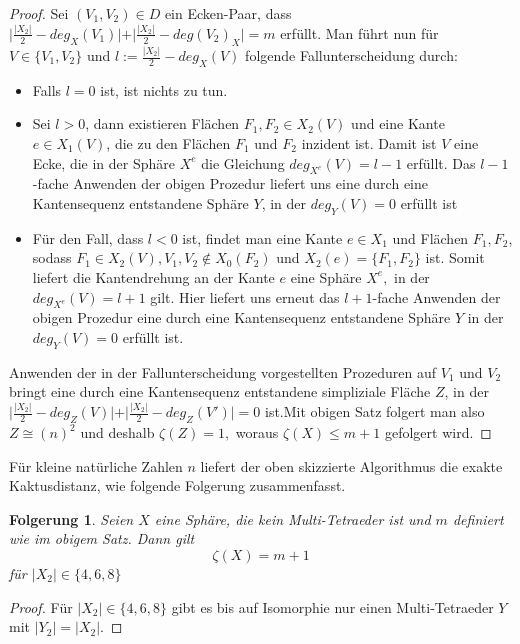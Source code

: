 \documentclass[12pt,titlepage,twoside,cleardoublepage]{article}
\theoremstyle{nummermitklammern}
\newtheorem{folgerung}[temp]{Folgerung}
\newtheorem{folgerung}[zahl]{Folgerung}
\numberwithin{equation}{section}
\begin{document}
\begin{proof}
Sei $(V_1,V_2)\in D$ ein Ecken-Paar, dass 
$\vert\frac{\vert X_2 \vert}{2}-deg_X(V_1)\vert +\vert \frac{\vert X_2 \vert}{2}-deg(V_2)_X\vert=m$ erfüllt.
Man führt nun für $V \in \{V_1,V_2\}$ und $l:=\frac{\vert X_2 \vert}{2}-deg_X(V)$ folgende Fallunterscheidung durch:
\begin{itemize}
\item Falls $l=0$ ist, ist nichts zu tun.
\item Sei $l>0$, dann existieren Flächen $F_1,F_2 \in X_2(V)$ und eine Kante $e\in X_1(V)$, die zu den Flächen $F_1$ und $F_2$ inzident ist. Damit ist $V$ eine Ecke, die in der Sphäre $X^e$ die Gleichung $deg_{X^e}(V)=l-1$ erfüllt. Das $l-1$-fache Anwenden der obigen Prozedur liefert uns eine durch eine Kantensequenz entstandene Sphäre $Y$, in der  $deg_Y(V)=0$ erfüllt ist 
 \item Für den Fall, dass $l<0$ ist, findet man eine Kante $e\in X_1$ und Flächen $F_1,F_2$, sodass $F_1\in X_2(V),V_1,V_2 \notin X_0(F_2)$ und $X_2(e)=\{F_1,F_2\}$ ist. Somit liefert die Kantendrehung an der Kante $e$ eine Sphäre $X^e,$ in der $deg_{X^e}(V)=l+1$ gilt. Hier liefert uns erneut das $l+1$-fache Anwenden der obigen Prozedur eine durch eine Kantensequenz entstandene Sphäre $Y$ in der  $deg_Y(V)=0$ erfüllt ist.
\end{itemize}  
 Anwenden der in der Fallunterscheidung vorgestellten Prozeduren auf $V_1$ und $V_2$ bringt eine durch eine Kantensequenz entstandene simpliziale Fläche $Z$, in der $\vert\frac{\vert X_2 \vert}{2}-deg_Z(V)\vert +\vert \frac{\vert X_2 \vert}{2}-deg_Z(V')\vert=0$ ist.Mit obigen Satz folgert man also $Z\cong (n)^2$ und deshalb $\zeta(Z)=1,$ woraus $\zeta(X)\leq m+1$ gefolgert wird. 
\end{proof}

Für kleine natürliche Zahlen $n$ liefert der oben skizzierte Algorithmus die exakte Kaktusdistanz, wie folgende Folgerung zusammenfasst. 
\begin{folgerung}
Seien $X$ eine Sphäre, die kein Multi-Tetraeder ist und $m$ definiert wie im obigem Satz. Dann gilt 
\[
\zeta(X)= m+1
\]
 für $\vert X_2 \vert \in \{4,6,8\}$ 
\end{folgerung}
\begin{proof}
Für $\vert X_2 \vert \in \{4,6,8\}$ gibt es bis auf Isomorphie nur einen Multi-Tetraeder $Y$ mit $\vert Y_2\vert=\vert X_2\vert.$
\end{proof}
\end{document}
